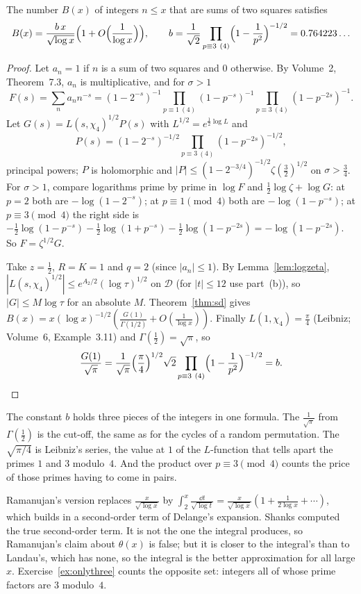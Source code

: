 \begin{corollary}[Landau, 1908]\label{cor:landau}
The number $B(x)$ of integers $n\le x$ that are sums of two squares satisfies
\[
B(x)=\frac{b\,x}{\sqrt{\log x}}\Bigl(1+O\Bigl(\frac1{\log x}\Bigr)\Bigr),\qquad b=\frac1{\sqrt2}\prod_{p\equiv3\ (4)}\Bigl(1-\frac1{p^2}\Bigr)^{-1/2}=0.764223\ldots
\]
\end{corollary}
\begin{proof}
Let $a_n=1$ if $n$ is a sum of two squares and $0$ otherwise. By Volume~2, Theorem~7.3, $a_n$ is multiplicative, and for $\sigma>1$
\[
F(s)=\sum_na_nn^{-s}=(1-2^{-s})^{-1}\prod_{p\equiv1\ (4)}(1-p^{-s})^{-1}\prod_{p\equiv3\ (4)}(1-p^{-2s})^{-1}.
\]
Let $G(s)=L(s,\chi_4)^{1/2}P(s)$ with $L^{1/2}=e^{\frac12\log L}$ and
\[
P(s)=(1-2^{-s})^{-1/2}\prod_{p\equiv3\ (4)}(1-p^{-2s})^{-1/2},
\]
principal powers; $P$ is holomorphic and $|P|\le(1-2^{-3/4})^{-1/2}\zeta(\frac32)^{1/2}$ on $\sigma>\frac34$. For $\sigma>1$, compare logarithms prime by prime in $\log F$ and $\frac12\log\zeta+\log G$: at $p=2$ both are $-\log(1-2^{-s})$; at $p\equiv1\pmod4$ both are $-\log(1-p^{-s})$; at $p\equiv3\pmod4$ the right side is $-\frac12\log(1-p^{-s})-\frac12\log(1+p^{-s})-\frac12\log(1-p^{-2s})=-\log(1-p^{-2s})$. So $F=\zeta^{1/2}G$.

Take $z=\frac12$, $R=K=1$ and $q=2$ (since $|a_n|\le1$). By Lemma~\ref{lem:logzeta}, $|L(s,\chi_4)^{1/2}|\le e^{A_2/2}(\log\tau)^{1/2}$ on $\mathcal D$ (for $|t|\le12$ use part~(b)), so $|G|\le M\log\tau$ for an absolute $M$. Theorem~\ref{thm:sd} gives $B(x)=x(\log x)^{-1/2}(\frac{G(1)}{\Gamma(1/2)}+O(\frac1{\log x}))$. Finally $L(1,\chi_4)=\frac\pi4$ (Leibniz; Volume~6, Example~3.11) and $\Gamma(\frac12)=\sqrt\pi$, so
\[
\frac{G(1)}{\sqrt\pi}=\frac1{\sqrt\pi}\Bigl(\frac\pi4\Bigr)^{1/2}\sqrt2\prod_{p\equiv3\ (4)}\Bigl(1-\frac1{p^2}\Bigr)^{-1/2}=b.\qedhere
\]
\end{proof}

\begin{beauty}
The constant $b$ holds three pieces of the integers in one formula. The $\frac1{\sqrt\pi}$ from $\Gamma(\frac12)$ is the cut-off, the same as for the cycles of a random permutation. The $\sqrt{\pi/4}$ is Leibniz's series, the value at $1$ of the $L$-function that tells apart the primes $1$ and $3$ modulo~$4$. And the product over $p\equiv3\pmod4$ counts the price of those primes having to come in pairs.
\end{beauty}

Ramanujan's version replaces $\frac x{\sqrt{\log x}}$ by $\int_2^x\frac{\dd t}{\sqrt{\log t}}=\frac x{\sqrt{\log x}}(1+\frac1{2\log x}+\cdots)$, which builds in a second-order term of Delange's expansion. Shanks computed the true second-order term. It is not the one the integral produces, so Ramanujan's claim about $\theta(x)$ is false; but it is closer to the integral's than to Landau's, which has none, so the integral is the better approximation for all large $x$. Exercise~\ref{ex:onlythree} counts the opposite set: integers all of whose prime factors are $3$ modulo~$4$.
